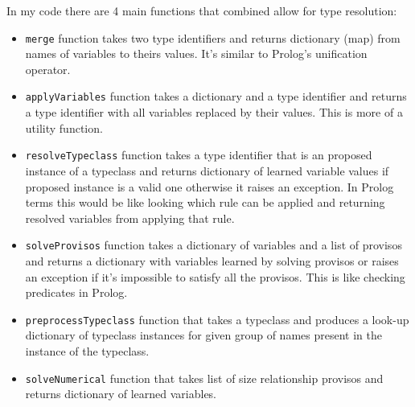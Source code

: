 \documentclass[12pt]{report}
\begin{document}
\newpage
\par
In my code there are 4 main functions that combined allow for type resolution:
\begin{itemize}
    \item \verb!merge! function takes two type identifiers and returns dictionary (map) from names of variables to theirs values. It's similar to Prolog's unification operator.
    \item \verb!applyVariables! function takes a dictionary and a type identifier and returns a type identifier with all variables replaced by their values. This is more of a utility function.
    \item \verb!resolveTypeclass! function takes a type identifier that is an proposed instance of a typeclass and returns dictionary of learned variable values if proposed instance is a valid one otherwise it raises an exception. In Prolog terms this would be like looking which rule can be applied and returning resolved variables from applying that rule.
    \item \verb!solveProvisos! function takes a dictionary of variables and a list of provisos and returns a dictionary with variables learned by solving provisos or raises an exception if it's impossible to satisfy all the provisos. This is like checking predicates in Prolog.
    \item \verb!preprocessTypeclass! function that takes a typeclass and produces a look-up dictionary of typeclass instances for given group of names present in the instance of the typeclass.
    \item \verb!solveNumerical! function that takes list of size relationship provisos and returns dictionary of learned variables.
\end{itemize}
\end{document}
